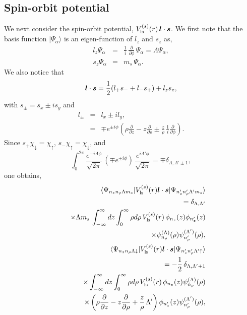 \documentclass[superscriptaddress,twocolumn,amsmath,amssymb]{revtex4}
\renewcommand{\vec}[1]{\mbox{\boldmath $#1$}}
\begin{document}
\subsection{Spin-orbit potential}

We next consider the spin-orbit potential, 
$V_{\rm ls}^{(s)}(r)\,\vec{l}\cdot\vec{s}$. 
We first note that the basis function 
$|\Psi_{\alpha}\rangle$ is an eigen-function of $l_z$ and $s_z$ as, 
%
\begin{eqnarray}
l_z\Psi_\alpha &=& \frac{1}{i}\,\frac{\partial}{\partial\phi}\,\Psi_\alpha
= \Lambda\Psi_\alpha, \\
s_z\Psi_\alpha &=& m_s\,\Psi_\alpha. 
\end{eqnarray}
%
We also notice that 
%
\begin{equation}
\vec{l}\cdot\vec{s}=\frac{1}{2}(l_+s_- + l_-s_+) + l_zs_z,
\end{equation}
%
with $s_\pm=s_x\pm i s_y$ and 
%
\begin{eqnarray}
l_\pm & = & l_x \pm il_y, \\
&=&\mp e^{\pm i\phi}
\left(\rho\frac{\partial}{\partial z}-z\frac{\partial}{\partial \rho}
\pm \frac{z}{\rho}\,\frac{1}{i}\frac{\partial}{\partial \phi}\right). 
\end{eqnarray}
%
Since $s_+\chi_{\downarrow}=\chi_\uparrow$, $s_-\chi_{\uparrow}=\chi_\downarrow$, 
and
%
\begin{equation}
\int^{2\pi}_0\frac{e^{-i\Lambda\phi}}{\sqrt{2\pi}}\,
(\mp e^{\pm i\phi})\,\frac{e^{i\Lambda'\phi}}{\sqrt{2\pi}}
=\mp \delta_{\Lambda,\Lambda'\pm1}, 
\end{equation}
%
one obtains, 
%
\begin{eqnarray}
&&\langle\Psi_{n_zn_\rho\Lambda m_s}
|V_{\rm ls}^{(s)}(r)\vec{l}\cdot\vec{s}|\Psi_{n'_zn'_\rho\Lambda' m_s}\rangle 
\nonumber \\
&&\quad=\delta_{\Lambda,\Lambda'} \nonumber \\
&&\quad\times\Lambda m_s\,\int^\infty_{-\infty}dz \int^{\infty}_0\rho d\rho\,
V_{\rm ls}^{(s)}(r)\,
\phi_{n_z}(z)\phi_{n_z'}(z) \nonumber \\
&&\quad\times \psi_{n_\rho}^{(\Lambda)}(\rho)\psi_{n_\rho'}^{(\Lambda')}(\rho), \\
%
&&\langle\Psi_{n_zn_\rho\Lambda \downarrow}
|V_{\rm ls}^{(s)}(r)\vec{l}\cdot\vec{s}|\Psi_{n'_zn'_\rho\Lambda' \uparrow}\rangle 
\nonumber \\
&&\quad=-\frac{1}{2}\,\delta_{\Lambda,\Lambda'+1} \nonumber \\
&&\quad\times\int^\infty_{-\infty}dz \int^{\infty}_0\rho d\rho\,
V_{\rm ls}^{(s)}(r)\,
\phi_{n_z}(z)\psi_{n_\rho}^{(\Lambda)}(\rho)\nonumber \\
&&\quad\times 
\left(\rho\frac{\partial}{\partial z}-z\frac{\partial}{\partial \rho}
+ \frac{z}{\rho}\,\Lambda'\right) 
\phi_{n_z'}(z) 
\psi_{n_\rho'}^{(\Lambda')}(\rho),
\end{eqnarray}
\end{document}
